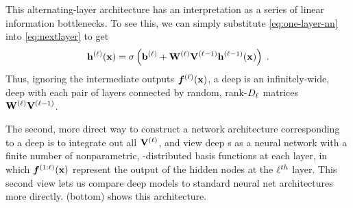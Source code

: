 This alternating-layer architecture has an interpretation as a series of linear information bottlenecks.
To see this, we can simply substitute \cref{eq:one-layer-nn} into \cref{eq:nextlayer} to get
%
\begin{align}
{\bf{h}}^{(\ell)}({\bf{x}}) = \sigma \left( {\bf{b}}^{(\ell)} + \mathbf{W}^{(\ell)} \mathbf{V}^{(\ell-1)} {\bf{h}}^{(\ell-1)}({\bf{x}}) \right) \;.
\end{align}
%
Thus, ignoring the intermediate outputs $\boldsymbol{f}^{(\ell)}({\bf{x}})$, a deep \gp{} is an infinitely-wide, deep \MLP{} with each pair of layers connected by random, rank-$D_\ell$ matrices $\mathbf{W}^{(\ell)} \mathbf{V}^{(\ell-1)}$. %



The second, more direct way to construct a network architecture corresponding to a deep \gp{} is to integrate out all $\mathbf{V}^{(\ell)}$, and view deep \gp{}s as a neural network with a finite number of nonparametric, \gp{}-distributed basis functions at each layer, in which $\boldsymbol{f}^{(1:\ell)}({\bf{x}})$ represent the output of the hidden nodes at the $\ell^{th}$ layer.
This second view lets us compare deep \gp{} models to standard neural net architectures more directly.
(bottom) shows this architecture.









